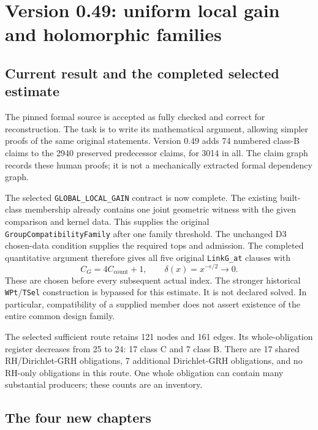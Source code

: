 \section{Version 0.49: uniform local gain and holomorphic families}
\label{sec:dependency-audit-v49}

\subsection{Current result and the completed selected estimate}

The pinned formal source is accepted as fully checked and correct for
reconstruction. The task is to write its mathematical argument,
allowing simpler proofs of the same original statements. Version 0.49
adds 74 numbered class-B claims to the 2940 preserved predecessor
claims, for 3014 in all. The claim graph records these human proofs;
it is not a mechanically extracted formal dependency graph.

The selected \texttt{GLOBAL\_\allowbreak LOCAL\_\allowbreak GAIN} contract is now complete.
The existing built-class membership already contains one joint
geometric witness with the given comparison and kernel data. This
supplies the original \texttt{Group\allowbreak Compatibility\allowbreak Family} after one
family threshold. The unchanged D3 chosen-data condition supplies
the required tops and admission. The completed quantitative argument
therefore gives all five original \texttt{Link\allowbreak G\_\allowbreak at} clauses with
\[
 C_G=4C_{\mathrm{count}}+1,
 \qquad\delta(x)=x^{-\epsilon/2}\longrightarrow0.
\]
These are chosen before every subsequent actual index. The stronger
historical \texttt{WPt}/\texttt{TSel} construction is bypassed for
this estimate. It is not declared solved. In particular, compatibility
of a supplied member does not assert existence of the entire common
design family.

The selected sufficient route retains 121 nodes and 161 edges.
Its whole-obligation register decreases from 25 to 24:
17 class C and 7 class B. There are 17 shared RH/Dirichlet-GRH
obligations, 7 additional Dirichlet-GRH obligations, and no
RH-only obligations in this route. One whole obligation can contain
many substantial producers; these counts are an inventory.

\subsection{The four new chapters}

